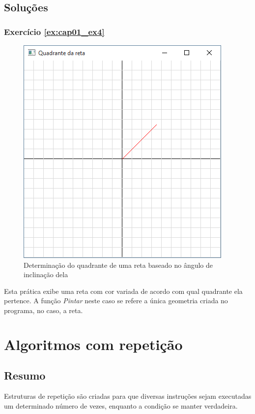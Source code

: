 \section{Soluções}

\subsection*{Exercício \ref{ex:cap01_ex4}}
\begin{figure}[ht]
  \centerline{\includegraphics[width=.5\textwidth]{img/cap1_ex4.png}}
  \caption{Determinação do quadrante de uma reta baseado no ângulo de inclinação dela}
  \label{fig:cap01_ex4}
\end{figure}
Esta prática exibe uma reta com cor variada de acordo com qual quadrante ela pertence. A função \emph{Pintar} neste caso se refere a única geometria criada no programa, no caso, a reta.



\chapter[Algoritmos com repetição]
{Algoritmos com repetição}



\section{Resumo}

Estruturas de repetição são criadas para que diversas instruções sejam executadas um determinado número de vezes, enquanto a condição se manter verdadeira.


%
%

